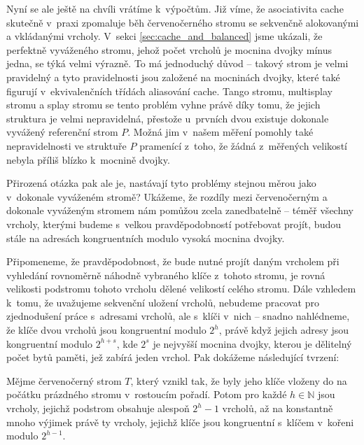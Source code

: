 Nyní se ale ještě na chvíli vrátíme k~výpočtům. Již víme, že asociativita cache
skutečně v~praxi zpomaluje běh červenočerného stromu se sekvenčně alokovanými a vkládanými vrcholy. V~sekci \ref{sec:cache_and_balanced} jsme ukázali, že
perfektně vyváženého stromu, jehož počet vrcholů je mocnina dvojky mínus jedna,
se týká velmi výrazně. To má jednoduchý důvod -- takový strom je velmi
pravidelný a tyto pravidelnosti jsou založené na mocninách dvojky, které také
figurují v~ekvivalenčních třídách aliasování cache. Tango stromu, multisplay
stromu a splay stromu se tento problém vyhne právě díky tomu, že jejich
struktura je velmi nepravidelná, přestože u~prvních dvou existuje dokonale
vyvážený referenční strom $P$. Možná jim v~našem měření pomohly také
nepravidelnosti ve struktuře $P$ pramenící z~toho, že žádná z~měřených
velikostí nebyla příliš blízko k~mocnině dvojky.

Přirozená otázka pak ale je, nastávají tyto problémy stejnou měrou jako
v~dokonale vyváženém stromě? Ukážeme, že rozdíly mezi červenočerným a dokonale
vyváženým stromem nám pomůžou zcela zanedbatelně -- téměř všechny vrcholy,
kterými budeme s~velkou pravděpodobností potřebovat projít, budou stále na
adresách kongruentních modulo vysoká mocnina dvojky. 

Připomeneme, že
pravděpodobnost, že bude nutné projít daným vrcholem při vyhledání rovnoměrně náhodně vybraného klíče z~tohoto stromu, je rovná velikosti
podstromu tohoto vrcholu dělené velikostí celého stromu. Dále vzhledem k~tomu,
že uvažujeme sekvenční uložení vrcholů, nebudeme pracovat pro zjednodušení
práce s~adresami vrcholů, ale s~klíči v~nich -- snadno nahlédneme, že klíče
dvou vrcholů jsou kongruentní modulo $2^h$, právě když jejich adresy jsou
kongruentní modulo $2^{h+s}$, kde $2^s$ je nejvyšší mocnina dvojky, kterou je
dělitelný počet bytů paměti, jež zabírá jeden vrchol. Pak dokážeme
následující tvrzení:

\begin{tvrz}\label{tvrz:vec}
Mějme červenočerný strom $T$, který vznikl tak, že byly jeho klíče vloženy do na počátku prázdného stromu v~rostoucím pořadí. Potom pro každé $h\in \mathbb N$ jsou vrcholy, jejichž podstrom obsahuje alespoň $2^h -1$ vrcholů, až na konstantně mnoho výjimek právě ty vrcholy, jejichž klíče jsou kongruentní s~klíčem v~kořeni modulo $2^{h-1}$.
\end{tvrz}

